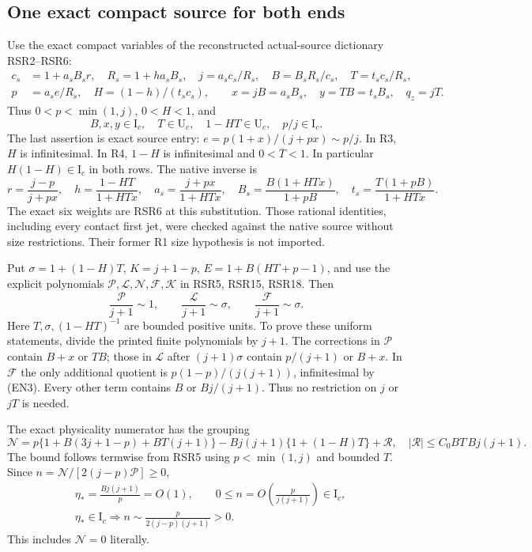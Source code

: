 \subsection{One exact compact source for both ends}

Use the exact compact variables of the reconstructed actual-source
dictionary RSR2--RSR6:
\[
\begin{aligned}
c_s&=1+a_sB_sr,\quad R_s=1+ha_sB_s,\quad
j=a_sc_s/R_s,\quad B=B_sR_s/c_s,\quad T=t_sc_s/R_s,\\
p&=a_s e/R_s,\quad H=(1-h)/(t_sc_s),\qquad
x=jB=a_sB_s,\quad y=TB=t_sB_s,\quad q_z=jT .
\end{aligned}                                                    \tag{EN2}
\]
Thus $0<p<\min(1,j)$, $0<H<1$, and
\[
B,x,y\in\mathrm I_c,\quad T\in\mathrm U_c,\quad
1-HT\in\mathrm U_c,\quad p/j\in\mathrm I_c.              \tag{EN3}
\]
The last assertion is exact source entry:
$e=p(1+x)/(j+px)\sim p/j$.
In R3, $H$ is infinitesimal. In R4, $1-H$ is infinitesimal
and $0<\overline T<1$. In particular
$H(1-H)\in\mathrm I_c$ in both rows.
The native inverse is
\[
r=\frac{j-p}{j+px},\quad h=\frac{1-HT}{1+HTx},\quad
a_s=\frac{j+px}{1+HTx},\quad
B_s=\frac{B(1+HTx)}{1+pB},\quad
t_s=\frac{T(1+pB)}{1+HTx}.                              \tag{EN4}
\]
The exact six weights are RSR6 at this substitution.
Those rational identities, including every contact first jet, were
checked against the native source without size restrictions. Their
former R1 size hypothesis is not imported.

Put $\sigma=1+(1-H)T$, $K=j+1-p$, $E=1+B(HT+p-1)$, and
use the explicit polynomials $\mathcal P,\mathcal L,\mathcal N,
\mathcal F,\mathcal K$ in RSR5, RSR15, RSR18. Then
\[
\frac{\mathcal P}{j+1}\sim1,\qquad
\frac{\mathcal L}{j+1}\sim\sigma,\qquad
\frac{\mathcal F}{j+1}\sim\sigma.                       \tag{EN5}
\]
Here $T,\sigma,(1-HT)^{-1}$ are bounded positive units.
To prove these uniform statements, divide the printed finite
polynomials by $j+1$. The corrections in $\mathcal P$ contain
$B+x$ or $TB$; those in $\mathcal L$ after
$(j+1)\sigma$ contain $p/(j+1)$ or $B+x$.
In $\mathcal F$ the only additional quotient is
$p(1-p)/(j(j+1))$, infinitesimal by (EN3).
Every other term contains $B$ or $Bj/(j+1)$.
Thus no restriction on $j$ or $jT$ is needed.

The exact physicality numerator has the grouping
\[
\mathcal N=p\{1+B(3j+1-p)+BT(j+1)\}
-Bj(j+1)\{1+(1-H)T\}+\mathcal R,\quad
|\mathcal R|\le C_0BT\,Bj(j+1).                         \tag{EN6}
\]
The bound follows termwise from RSR5 using $p<\min(1,j)$ and
bounded $T$. Since $n=\mathcal N/[2(j-p)\mathcal P]\ge0$,
\[
\begin{aligned}
&\eta_*=\frac{Bj(j+1)}p=O(1),\qquad
0\le n=O\!\left(\frac{p}{j(j+1)}\right)\in\mathrm I_c,\\
&\eta_*\in\mathrm I_c\Longrightarrow
n\sim\frac{p}{2(j-p)(j+1)}>0 .
\end{aligned}                                                    \tag{EN7}
\]
This includes $\mathcal N=0$ literally.

